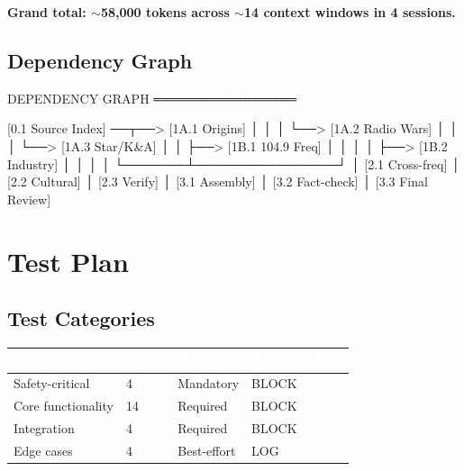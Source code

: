 \documentclass[11pt,letterpaper]{article}
\newcommand{\tableheader}[1]{\textbf{\sffamily\textcolor{white}{#1}}}
\begin{document}
\textbf{Grand total: $\sim$58,000 tokens across $\sim$14 context windows in 4 sessions.}

\subsection{Dependency Graph}

\begin{asciibox}
DEPENDENCY GRAPH
════════════════

  [0.1 Source Index] ──┬──> [1A.1 Origins]
                       │       │
                       │       └──> [1A.2 Radio Wars]
                       │               │
                       │               └──> [1A.3 Star/K&A]
                       │                       │
                       ├──> [1B.1 104.9 Freq]   │
                       │       │                │
                       ├──> [1B.2 Industry]     │
                       │       │                │
                       └───────┴────────────────┘
                               │
                        [2.1 Cross-freq]
                               │
                        [2.2 Cultural]
                               │
                        [2.3 Verify]
                               │
                        [3.1 Assembly]
                               │
                        [3.2 Fact-check]
                               │
                        [3.3 Final Review]
\end{asciibox}

\section{Test Plan}

\subsection{Test Categories}

\begin{center}
\begin{tabularx}{\textwidth}{L{3cm}C{1.5cm}C{1.5cm}C{2cm}}
\toprule
{}
\tableheader{Category} & \tableheader{Count} & \tableheader{Priority} & \tableheader{Failure Action} \\
\midrule
Safety-critical & 4 & Mandatory & BLOCK \\
Core functionality & 14 & Required & BLOCK \\
Integration & 4 & Required & BLOCK \\
Edge cases & 4 & Best-effort & LOG \\
\bottomrule
\end{tabularx}
\end{center}
\end{document}
